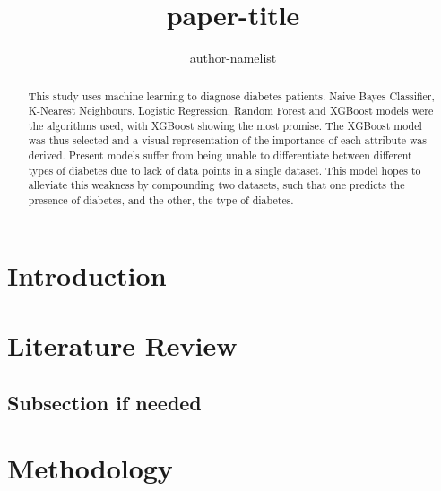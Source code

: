 \documentclass{article}
\title{paper-title}
\author{author-namelist}
\begin{document}
\maketitle

\begin{abstract}
	This study uses machine learning to diagnose diabetes patients. Naive Bayes Classifier, K-Nearest Neighbours, Logistic Regression, Random Forest and XGBoost models were the algorithms used, with XGBoost showing the most promise. The XGBoost model was thus selected and a visual representation of the importance of each attribute was derived. Present models suffer from being unable to differentiate between different types of diabetes due to lack of data points in a single dataset. This model hopes to alleviate this weakness by compounding two datasets, such that one predicts the presence of diabetes, and the other, the type of diabetes.
\end{abstract}

\section{Introduction}


\section{Literature Review}


\subsection{Subsection if needed}

\section{Methodology}
\end{document}
